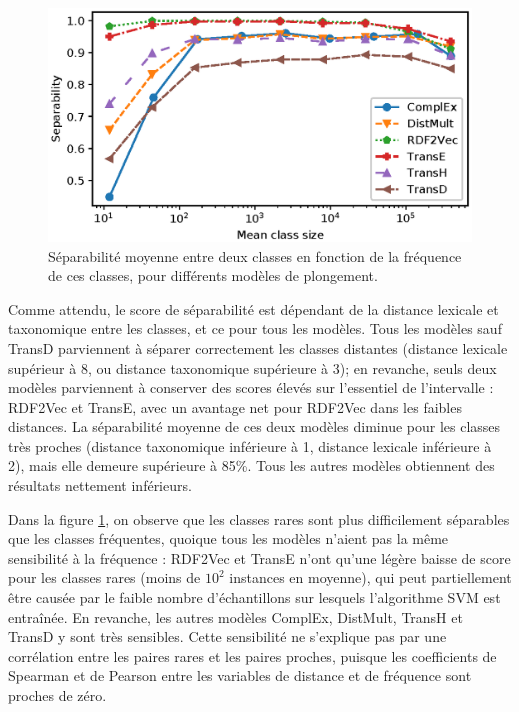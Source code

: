 \begin{figure}[h]
  \centering
  \includegraphics[width=0.8\linewidth]{fig/plot/separability2_type1.eps}
  \caption[Séparabilité moyenne en fonction de la fréquence des classes]{Séparabilité moyenne entre deux classes en fonction de la fréquence de ces classes, pour différents modèles de plongement.}
  \label{fig:separability-freq}
\end{figure}

Comme attendu, le score de séparabilité est dépendant de la distance lexicale et taxonomique entre les classes, et ce pour tous les modèles. Tous les modèles sauf TransD parviennent à séparer correctement les classes distantes (distance lexicale supérieur à 8, ou distance taxonomique supérieure à 3); en revanche, seuls deux modèles parviennent à conserver des scores élevés sur l'essentiel de l'intervalle : RDF2Vec et TransE, avec un avantage net pour RDF2Vec dans les faibles distances. La séparabilité moyenne de ces deux modèles diminue pour les classes très proches (distance taxonomique inférieure à 1, distance lexicale inférieure à 2), mais elle demeure supérieure à 85\%. Tous les autres modèles obtiennent des résultats nettement inférieurs.

Dans la figure \ref{fig:separability-freq}, on observe que les classes rares sont plus difficilement séparables que les classes fréquentes, quoique tous les modèles n'aient pas la même sensibilité à la fréquence : RDF2Vec et TransE n'ont qu'une légère baisse de score pour les classes rares (moins de $10^2$ instances en moyenne), qui peut partiellement être causée par le faible nombre d'échantillons sur lesquels l'algorithme SVM est entraînée. En revanche, les autres modèles ComplEx, DistMult, TransH et TransD y sont très sensibles. Cette sensibilité ne s'explique pas par une corrélation entre les paires rares et les paires proches, puisque les coefficients de Spearman et de Pearson entre les variables de distance et de fréquence sont proches de zéro.

